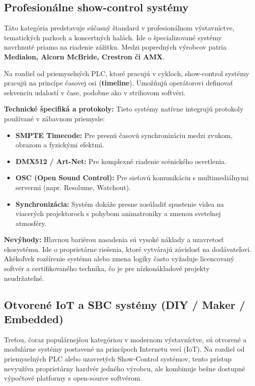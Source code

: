 \subsection{Profesionálne show-control systémy}
\label{show-control}
Táto kategória predstavuje súčasný štandard v profesionálnom výstavníctve, tematických parkoch a koncertných halách. Ide o špecializované systémy navrhnuté priamo na riadenie zážitku. Medzi popredných výrobcov patria \textbf{Medialon, Alcorn McBride, Crestron či AMX}.

Na rozdiel od priemyselných PLC, ktoré pracujú v cykloch, show-control systémy pracujú na princípe časovej osi (\textbf{timeline}). Umožňujú operátorovi definovať sekvenciu udalostí v čase, podobne ako v strihovom softvéri.

\textbf{Technické špecifiká a protokoly:}
Tieto systémy natívne integrujú protokoly používané v zábavnom priemysle:
\begin{itemize}
    \item \textbf{SMPTE Timecode:} Pre presnú časovú synchronizáciu medzi zvukom, obrazom a fyzickými efektmi.
    \item \textbf{DMX512 / Art-Net:} Pre komplexné riadenie scénického osvetlenia.
    \item \textbf{OSC (Open Sound Control):} Pre sieťovú komunikáciu s multimediálnymi servermi (napr. Resolume, Watchout).
    \item \textbf{Synchronizácia:} Systém dokáže presne zosúladiť spustenie videa na viacerých projektoroch s pohybom animatroniky a zmenou svetelnej atmosféry.
\end{itemize}

\textbf{Nevýhody:}
Hlavnou bariérou nasadenia sú vysoké náklady a uzavretosť ekosystému. Ide o proprietárne riešenia, ktoré vytvárajú závislosť na dodávateľovi. Akékoľvek rozšírenie systému alebo zmena logiky často vyžaduje licencovaný softvér a certifikovaného technika, čo je pre nízkonákladové projekty neudržateľné.

\subsection{Otvorené IoT a SBC systémy (DIY / Maker / Embedded)}
\label{otvorene-iot}

Treťou, čoraz populárnejšou kategóriou v modernom výstavníctve, sú otvorené a modulárne systémy postavené na princípoch Internetu vecí (IoT). Na rozdiel od priemyselných PLC alebo uzavretých Show-Control systémov, tento prístup nevyužíva proprietárny hardvér jedného výrobcu, ale kombinuje bežne dostupné výpočtové platformy s open-source softvérom.

